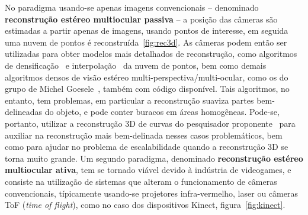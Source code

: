 No paradigma usando-se apenas imagens convencionais -- denominado
\textbf{reconstrução estéreo multiocular passiva} --  a posição das câmeras são
estimadas a partir apenas de imagens, usando pontos de interesse, em seguida uma
nuvem de pontos é reconstruída~\ref{fig:rec3d}.
As câmeras podem então ser utilizadas para obter modelos mais detalhados de reconstrução, como algoritmos de densificação~\cite{furukawa2007dense} e interpolação~\cite{poisson} da nuvem de pontos, bem como demais algoritmos densos de visão estéreo multi-perspectiva/multi-ocular, como os do grupo de Michel Goesele~\cite{mve}, também com código disponível. Tais algoritmos, no entanto, tem problemas, em particular a reconstrução suaviza partes bem-delineadas do objeto, e pode conter buracos em áreas homogêneas. Pode-se, portanto, utilizar a reconstrução 3D de curvas do pesquisador proponente~\cite{Usumezbas:Fabbri:Kimia:ECCV16,Fabbri:Kimia:IJCV2016,Fabbri:Kimia:CVPR10,Fabbri:Giblin:Kimia:ECCV12} para auxiliar na reconstrução mais bem-delinada nesses casos problemáticos, bem como para ajudar
no problema de escalabilidade quando a reconstrução 3D se torna muito grande.
Um segundo paradigma, denominado \textbf{reconstrução estéreo multiocular
ativa}, tem se tornado viável devido à indústria de videogames, e consiste na
utilização de sistemas que alteram o funcionamento de câmeras convencionais,
típicamente usando-se projetores infra-vermelho, laser ou câmeras ToF (\emph{time of
flight}), como no caso dos dispositivos Kinect, figura~\ref{fig:kinect}.

